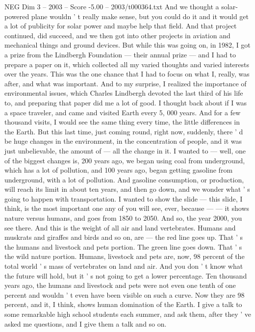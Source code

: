 \begin{textsample}{NEG Dim 3 – 2003 – Score -5.00 – 2003/t000364.txt}
And we thought a solar-powered plane wouldn ' t really make sense, but you could do it and it would get a lot of publicity for solar power and maybe help that field.
And that project continued, did succeed, and we then got into other projects in aviation and mechanical things and ground devices.
But while this was going on, in 1982, I got a prize from the Lindbergh Foundation — their annual prize — and I had to prepare a paper on it, which collected all my varied thoughts and varied interests over the years.
This was the one chance that I had to focus on what I, really, was after, and what was important.
And to my surprise, I realized the importance of environmental issues, which Charles Lindbergh devoted the last third of his life to, and preparing that paper did me a lot of good.
I thought back about if I was a space traveler, and came and visited Earth every 5, 000 years.
And for a few thousand visits, I would see the same thing every time, the little differences in the Earth.
But this last time, just coming round, right now, suddenly, there ' d be huge changes in the environment, in the concentration of people, and it was just unbelievable, the amount of — all the change in it.
I wanted to — well, one of the biggest changes is, 200 years ago, we began using coal from underground, which has a lot of pollution, and 100 years ago, began getting gasoline from underground, with a lot of pollution.
And gasoline consumption, or production, will reach its limit in about ten years, and then go down, and we wonder what ' s going to happen with transportation.
I wanted to show the slide — this slide, I think, is the most important one any of you will see, ever, because — — it shows nature versus humans, and goes from 1850 to 2050.
And so, the year 2000, you see there.
And this is the weight of all air and land vertebrates.
Humans and muskrats and giraffes and birds and so on, are — the red line goes up.
That ' s the humans and livestock and pets portion.
The green line goes down.
That ' s the wild nature portion.
Humans, livestock and pets are, now, 98 percent of the total world ' s mass of vertebrates on land and air.
And you don ' t know what the future will hold, but it ' s not going to get a lower percentage.
Ten thousand years ago, the humans and livestock and pets were not even one tenth of one percent and wouldn ' t even have been visible on such a curve.
Now they are 98 percent, and it, I think, shows human domination of the Earth.
I give a talk to some remarkable high school students each summer, and ask them, after they ' ve asked me questions, and I give them a talk and so on.

\end{textsample}
